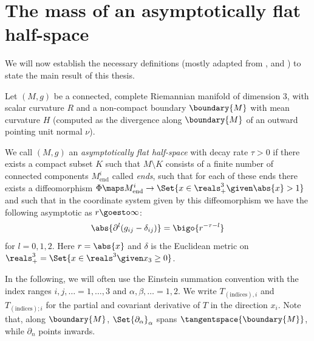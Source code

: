 \documentclass[titlepage,numbers=noenddot,headinclude,oneside,%
footinclude=true,cleardoublepage=empty,%
BCOR=5mm,paper=a4,fontsize=11pt,%
english,%
]{scrartcl}
\begin{document}
\section{The mass of an asymptotically flat half-space}
We will now establish the necessary definitions (mostly adapted from \cite{almarazPositiveMassTheorem2016}, \cite{eichmairDoublingAsymptoticallyFlat2023} and \cite{brayHarmonicFunctionsMass2019}) to state the main result of this thesis.
\begin{definition}
    Let \( (M,g) \) be a connected, complete Riemannian manifold of dimension 3, with scalar curvature \( R \) and a non-compact boundary \( \boundary{M} \) with mean curvature \( H \) (computed as the divergence along \( \boundary{M} \) of an outward pointing unit normal \( \nu \)).

    We call \((M,g) \) an \emph{asymptotically flat half-space} with decay rate \( \tau>0 \) if there exists a compact subset \( K \) such that \( M\setminus K \) consists of a finite number of connected components \(M_{\mathrm{end}}^i \) called \emph{ends}, such that for each of these ends there exists a diffeomorphism \( \Phi\maps M_{\mathrm{end}}^i \to \Set{x\in \reals^3_+\given \abs{x}>1} \) and such that in the coordinate system given by this diffeomorphism we have the following asymptotic as \( r\goesto \infty \):
    \begin{equation}
        \abs{\partial^l(g_{ij}-\delta_{ij})}=\bigo{r^{-\tau-l}}
    \end{equation}
    for \( l=0,1,2 \). Here \( r=\abs{x} \) and \( \delta \) is the Euclidean metric on \( \reals^3_+=\Set{x\in \reals^3\given x_3\geq 0} \). 
\end{definition}    
In the following, we will often use the Einstein summation convention with the index ranges \( i,j,\dotsc=1,\dotsc,3\) and \( \alpha,\beta,\dotsc=1,2 \). We write \( T_{(\text{indices}),i} \) and \( T_{(\text{indices});i} \) for the partial and covariant derivative of \( T \) in the direction \( x_i \). Note that, along \( \boundary{M} \), \( \Set{\partial_\alpha}_\alpha \) spans \( \tangentspace{\boundary{M}} \), while \( \partial_n \) points inwards.
\end{document}
